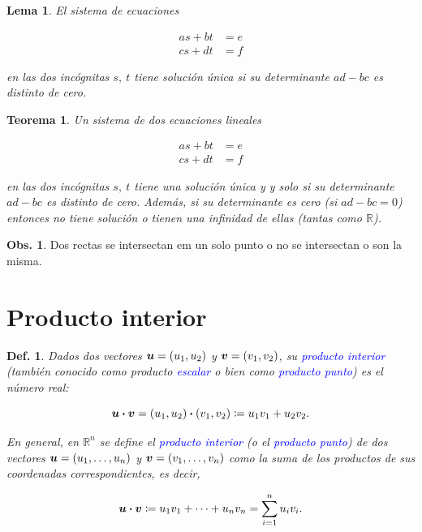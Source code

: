 \documentclass{article}
\theoremstyle{definicion}
\newtheorem{definicion}{Def.}
\theoremstyle{definition}             %
\theoremstyle{definition}             %
\theoremstyle{definition}
\theoremstyle{definition}
\theoremstyle{observacion}
\newtheorem{obs}{Obs.}
\theoremstyle{definition}
\theoremstyle{plain}
\newtheorem{lemma}{Lema}
\newtheorem{theorem}{Teorema}
\theoremstyle{definition}
\theoremstyle{afirmacion}
\theoremstyle{notation}
\theoremstyle{definition}
\begin{document}
        \begin{lemma}
            El sistema de ecuaciones

            \begin{align*}
                as + bt &= e \\
                cs + dt &= f
            \end{align*}

            en las dos incógnitas \(s,\ t\) tiene solución única si su determinante \(ad - bc\) es distinto de cero.
        \end{lemma}

        \begin{theorem}
            Un sistema de dos ecuaciones lineales

            \begin{align*}
                as + bt &= e \\
                cs + dt &= f
            \end{align*}

            en las dos incógnitas \(s,\ t\) tiene una solución única y y solo si su determinante \(ad - bc\) es distinto de cero. Además, si su determinante es cero (si \(ad - bc = 0\)) entonces no tiene solución o tienen una infinidad de ellas (tantas como \(\mathbb{R}\)).
        \end{theorem}

        \begin{obs}
            Dos rectas se intersectan em un solo punto o no se intersectan o son la misma.
        \end{obs}

        \section{Producto interior}

        \begin{definicion}
            Dados dos vectores \(\vb*{u} = (u_{1}, u_{2})\) y \(\vb*{v} = (v_{1}, v_{2})\), su \textcolor{blue}{producto interior} (también conocido como producto \textcolor{blue}{escalar} o bien como \textcolor{blue}{producto punto}) es el número real:

            \begin{equation*}
                \vb*{u} \vdot \vb*{v} = (u_{1}, u_{2}) \vdot (v_{1}, v_{2}) \coloneq u_{1}v_{1} + u_{2}v_{2}.
            \end{equation*}

            En general, en \(\mathbb{R}^{n}\) se define el \textcolor{blue}{producto interior} (o el \textcolor{blue}{producto punto}) de dos vectores \(\vb*{u} = (u_{1}, \ldots, u_{n})\) y \(\vb*{v} = (v_{1}, \ldots, v_{n})\) como la suma de los productos de sus coordenadas correspondientes, es decir, 

            \begin{equation*}
                \vb*{u} \vdot \vb*{v} \coloneq u_{1}v_{1} + \cdots + u_{n}v_{n} = \sum_{i = 1}^{n} u_{i}v_{i}.
            \end{equation*}
        \end{definicion}
\end{document}
